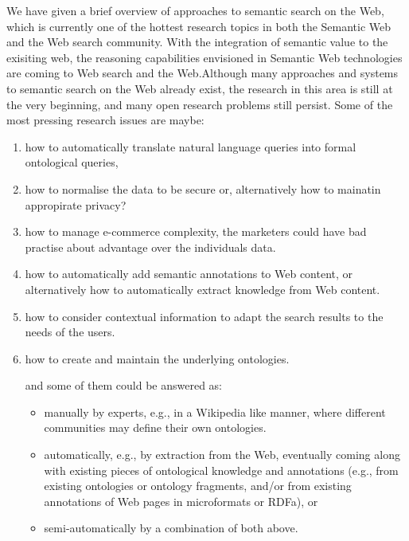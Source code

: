\documentclass[12pt,a4]{article}
\begin{document}
We have given a brief overview of approaches to semantic search on the Web, which is currently one of the hottest research topics in both the Semantic Web and the Web search community. With the integration of semantic value to the exisiting web, the reasoning capabilities envisioned in Semantic Web technologies are coming to Web search and the Web.Although many approaches and systems to semantic search on the Web already exist, the research in this area is still at the very beginning, and many open research problems still persist. Some of the most pressing research issues\cite{bettina} are maybe:
\begin{enumerate}
\item how to automatically translate natural language queries into formal ontological queries,
\item how to normalise the data to be secure or, alternatively how to mainatin appropirate privacy?
\item how to manage e-commerce complexity, the marketers could have bad practise about advantage over the individuals data.
\item how to automatically add semantic annotations to Web content, or alternatively how to automatically extract knowledge from Web content. 
\item how to consider contextual information to adapt the search results to the needs of the users.
\item how to create and maintain the underlying ontologies. 

  and some of them could be answered as:
  \begin{itemize}
  \item manually by experts, e.g., in a Wikipedia like manner, where different communities may define their own ontologies.
  \item automatically, e.g., by extraction from the Web, eventually coming along with existing pieces of ontological knowledge and annotations (e.g., from existing ontologies or ontology fragments, and/or from existing annotations of Web pages in microformats or RDFa), or
  \item semi-automatically by a combination of both above. 
  \end{itemize}
\end{enumerate}
\end{document}
